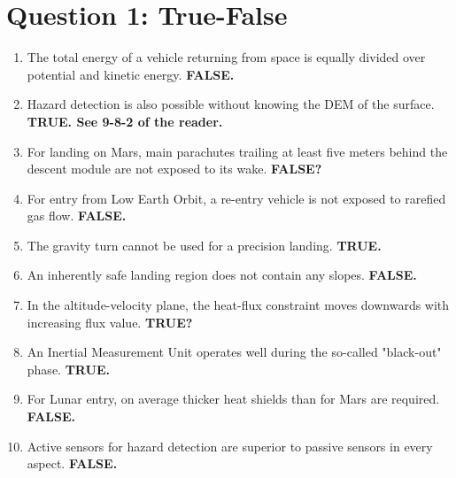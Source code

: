 \section{Question 1: True-False}\label{sec:q1}    
\begin{enumerate}[label=\alph*]
    \item The total energy of a vehicle returning from space is equally divided over potential and kinetic energy. \textbf{FALSE.}
    \item Hazard detection is also possible without knowing the DEM of the surface. \textbf{TRUE. See 9-8-2 of the reader.}
    \item For landing on Mars, main parachutes trailing at least five meters behind the descent module are not exposed to its wake. \textbf{FALSE?}
    \item For entry from Low Earth Orbit, a re-entry vehicle is not exposed to rarefied gas flow. \textbf{FALSE.}
    \item The gravity turn cannot be used for a precision landing. \textbf{TRUE.}
    \item An inherently safe landing region does not contain any slopes. \textbf{FALSE.}
    \item In the altitude-velocity plane, the heat-flux constraint moves downwards with increasing flux value. \textbf{TRUE?}
    \item An Inertial Measurement Unit operates well during the so-called "black-out" phase. \textbf{TRUE.}
    \item For Lunar entry, on average thicker heat shields than for Mars are required. \textbf{FALSE.}
    \item Active sensors for hazard detection are superior to passive sensors in every aspect. \textbf{FALSE.}
\end{enumerate}

